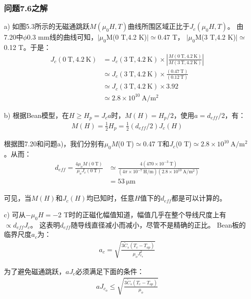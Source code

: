 \subsubsection{问题7.6之解}
a) 如图5.3所示的无磁通跳跃$M(\mu_0 H,T)$曲线所围区域正比于$J_c(\mu_0 H,T)$。
由7.20中$\phi$0.3 mm线的曲线可知，$|\mu_0$M(0 T,4.2 K)$|\simeq$0.47 T，
$|\mu_0$M(3 T,4.2 K)$|\simeq$0.12 T。于是：
\begin{align*}%
J_c(0\ \mathrm{T},4.2\ \mathrm{K})&=J_c(3\ \mathrm{T},4.2\ \mathrm{K})\times\left| \frac{M(0\ \mathrm{T},4.2\ \mathrm{K})}{M(3\ \mathrm{T},4.2\ \mathrm{K})}\right| \\ 
&\simeq J_c(3\ \mathrm{T},4.2\ \mathrm{K})\times\frac{(0.47\ \mathrm{T})}{(0.12\ \mathrm{T})}\\
&\simeq J_c(3\ \mathrm{T},4.2\ \mathrm{K})\times 3.92 \\
&\simeq 2.8\times 10^{10}\ \mathrm{A/m^2}
\end{align*}

b) 根据Bean模型，在$H\ge H_p=J_c a$时，$M(H)=H_p/2$，使用$a=d_{eff}/2$，有：
\begin{align*}%
M(H)=\frac{1}{2}H_p=\frac{1}{2}(d_{eff}/2)J_c(H)
\end{align*}

根据图7.20和问题a)，我们分别有$\mu_0 M$(0 T)$\simeq$0.47 T和$J_c$(0 T)$\simeq 2.8\times 10^{10}\ \mathrm{ A/m^2}$。从而：
\begin{align*}%
d_{eff}=\frac{4\mu_oM(0\ \mathrm{T})}{\mu_oJ_c(0\ \mathrm{T})}&\simeq\frac{4(470\times 10^{-3}\ \mathrm{T})}{(4\pi\times 10^{-7}\ \mathrm{H/m})(2.8\times10^{10}\ \mathrm{A/m^2})}\\
&=53\ \mathrm{\mu m}
\end{align*}

可见，当$M(H)$和$J_c(H)$均已知时，任意$H$值下的$d_{eff}$都是可以计算的。

c) 可从$-\mu_0 H=-$2 T时的正磁化幅值知道，幅值几乎在整个导线尺度上有$\propto d_{eff} J_c$。
这表明$d_{eff}$随导线直径减小而减小，尽管不是精确的正比。
Bean板的临界尺度$a_c$为：
\begin{align*}%
a_c=\sqrt{\frac{3\tilde{C}_s(T_c-T_{op})}{\mu_oJ_{c_o}^{2}}} \tag{5.40}
\end{align*}

为了避免磁通跳跃，$aJ_c$必须满足下面的条件：
\begin{align*}%
aJ_{c_o}\leq\sqrt{\frac{3\tilde{C}_s(T_c-T_{op})}{\mu_o}} \tag{S6.1}
\end{align*}

